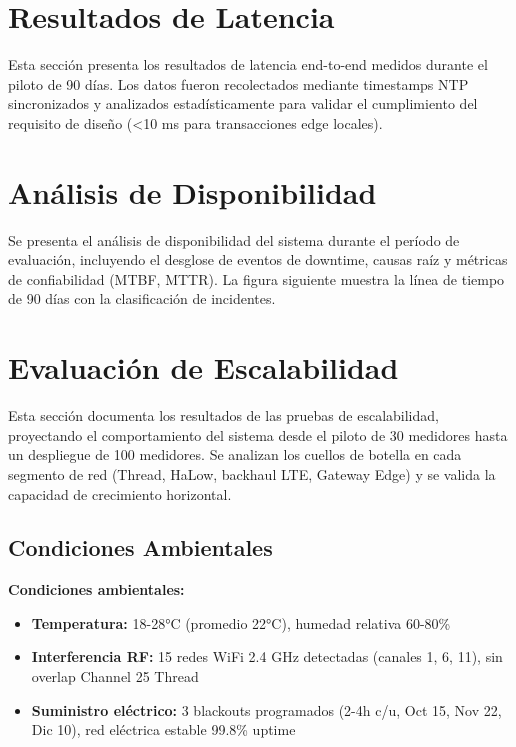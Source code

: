 \section{Resultados de Latencia}
\label{sec:res-latencia}

Esta sección presenta los resultados de latencia end-to-end medidos durante el piloto de 90 días. Los datos fueron recolectados mediante timestamps NTP sincronizados y analizados estadísticamente para validar el cumplimiento del requisito de diseño (<10 ms para transacciones edge locales).



\section{Análisis de Disponibilidad}
\label{sec:res-disponibilidad}

Se presenta el análisis de disponibilidad del sistema durante el período de evaluación, incluyendo el desglose de eventos de downtime, causas raíz y métricas de confiabilidad (MTBF, MTTR). La figura siguiente muestra la línea de tiempo de 90 días con la clasificación de incidentes.



\section{Evaluación de Escalabilidad}
\label{sec:res-escalabilidad}

Esta sección documenta los resultados de las pruebas de escalabilidad, proyectando el comportamiento del sistema desde el piloto de 30 medidores hasta un despliegue de 100 medidores. Se analizan los cuellos de botella en cada segmento de red (Thread, HaLow, backhaul LTE, Gateway Edge) y se valida la capacidad de crecimiento horizontal.



\subsection{Condiciones Ambientales}
\label{subsec:condiciones-ambientales}

\textbf{Condiciones ambientales:}

\begin{itemize}
    \item \textbf{Temperatura:} 18-28°C (promedio 22°C), humedad relativa 60-80\%
    \item \textbf{Interferencia RF:} 15 redes WiFi 2.4 GHz detectadas (canales 1, 6, 11), sin overlap Channel 25 Thread
    \item \textbf{Suministro eléctrico:} 3 blackouts programados (2-4h c/u, Oct 15, Nov 22, Dic 10), red eléctrica estable 99.8\% uptime
\end{itemize}

